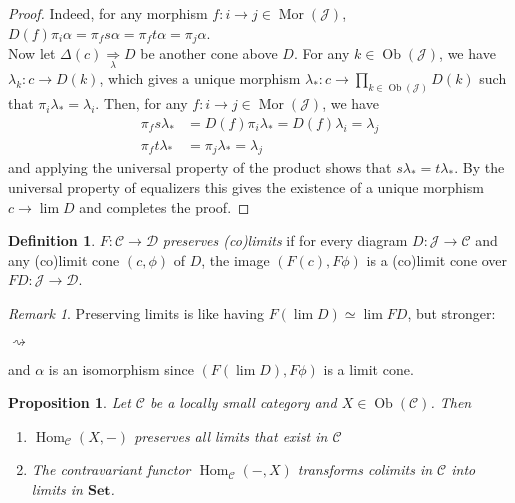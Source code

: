 \documentclass{article}
\newcommand{\cat}{\mathcal{C}}
\newcommand{\catt}{\mathcal{D}}
\newcommand{\Jcat}{\mathcal{J}}
\newcommand{\Set}{\mathbf{Set}}
\DeclareMathOperator{\Ob}{Ob}
\DeclareMathOperator{\Mor}{Mor}
\DeclareMathOperator{\Hom}{Hom}
\theoremstyle{plain}
\newtheorem{proposition}[theorem]{Proposition}
\theoremstyle{definition}
\newtheorem{definition}[theorem]{Definition}
\theoremstyle{remark}
\newtheorem*{remark}{Remark}
\begin{document}
\begin{proof}
    Indeed, for any morphism $f: i \to j \in \Mor(\Jcat)$, $D(f)\pi_i\alpha = \pi_f s \alpha = \pi_f t \alpha = \pi_j \alpha$. \\
    Now let $\Delta(c) \underset{\lambda}{\Rightarrow} D$ be another cone above $D$. For any $k \in \Ob(\Jcat)$, we have $\lambda_k : c \to D(k)$, which gives a unique morphism $\lambda_* : c \to \prod\limits_{k \in \Ob(\Jcat)} D(k)$ such that $\pi_i \lambda_* = \lambda_i$. Then, for any $f : i \to j \in \Mor(\Jcat)$, we have
    \begin{align*}
        \pi_f s \lambda_* & = D(f)\pi_i \lambda_* = D(f)\lambda_i = \lambda_j \\
        \pi_f t \lambda_* & = \pi_j \lambda_* = \lambda_j
    \end{align*} 
    and applying the universal property of the product shows that $s \lambda_* = t \lambda_*$. By the universal property of equalizers this gives the existence of a unique morphism $c \to \lim D$ and completes the proof.
\end{proof}

\begin{definition}
    $F : \cat \to \catt$ \emph{preserves (co)limits} if for every diagram $D : \Jcat \to \cat$ and any (co)limit cone $(c,\phi)$ of $D$, the image $(F(c),F\phi)$ is a (co)limit cone over $FD : \Jcat \to \catt$.
\end{definition}

\begin{remark}
    Preserving limits is like having $F(\lim D) \simeq \lim FD$, but stronger:
    \begin{center}
        \hspace{2em}$\rightsquigarrow$\hspace{2em}
    \end{center}
    and $\alpha$ is an isomorphism since $(F(\lim D), F\phi)$ is a limit cone.
\end{remark}

\begin{proposition}
    Let $\cat$ be a locally small category and $X \in \Ob(\cat)$. Then
    \begin{enumerate}
        \item $\Hom_\cat (X,-)$ preserves all limits that exist in $\cat$
        \item The contravariant functor $\Hom_\cat(-,X)$ transforms colimits in $\cat$ into limits in $\Set$.
    \end{enumerate}
\end{proposition}
\end{document}
